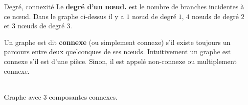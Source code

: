 \begin{frame}{Degré, connexité}
Le \textbf{degré d'un n{\oe}ud.} est le nombre de branches incidentes à ce n{\oe}ud. Dans le graphe ci-dessus il y a $1$ n{\oe}ud de degré $1$, $4$ n{\oe}uds de degré $2$ et $3$ n{\oe}uds de degré $3$.

Un graphe est dit \textbf{connexe} (ou simplement connexe) s'il existe toujours un parcours entre deux quelconques de ses n{\oe}uds. Intuitivement un graphe est connexe s'il est d'une pièce. Sinon, il est appelé non-connexe ou multiplement connexe.
\begin{center}
	 \\ 
	Graphe avec 3 composantes connexes.
\end{center}
\end{frame}

